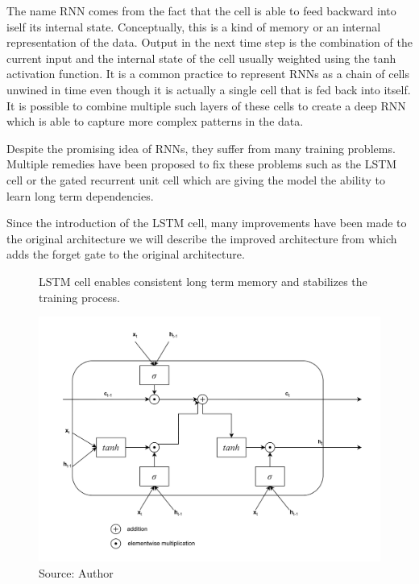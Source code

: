 The name \acl{RNN} comes from the fact that the cell is able
to feed backward into iself its internal state. Conceptually, this is a kind
of memory or an internal representation of the data. Output in the next
time step is the combination of the current input and the internal state
of the cell usually weighted using the tanh activation function. 
It is a common practice to represent \ac{RNN}s as a chain of cells 
unwined in time even though it is actually a single cell that is fed back into itself.
It is possible to combine multiple such layers of these cells to create
a deep \ac{RNN} which is able to capture more complex patterns in the data.



Despite the promising idea of \ac{RNN}s, they suffer from many training problems.
Multiple remedies have been proposed to fix these problems such as the \ac{LSTM} cell
or the gated recurrent unit cell which are giving the model the ability to learn
long term dependencies.

Since the introduction of the \ac{LSTM} cell, many improvements have been made to the original
architecture we will describe the improved architecture from \citep{Gers2000} which
adds the forget gate to the original architecture. 

\newpage
\begin{figure}[!h]
    \centering
    \caption{\ac{LSTM} cell enables 
    consistent long term memory and stabilizes the training process.}
    \includegraphics[width=1\textwidth]{Figures/LSTM.drawio.png}
    \caption*{Source: Author}
    \label{fig:lstm_cell}
\end{figure}


